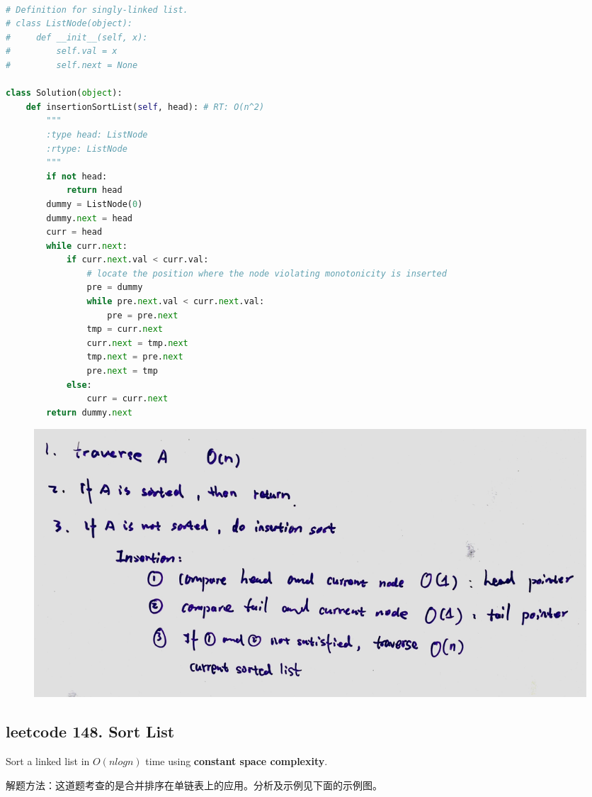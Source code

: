 \documentclass[a4paper,10pt]{article}
\begin{document}
\begin{lstlisting}[language=Python, caption=Problem147. Insertion Sort List]

# Definition for singly-linked list.
# class ListNode(object):
#     def __init__(self, x):
#         self.val = x
#         self.next = None

class Solution(object):
    def insertionSortList(self, head): # RT: O(n^2)
        """
        :type head: ListNode
        :rtype: ListNode
        """
        if not head:
            return head
        dummy = ListNode(0)
        dummy.next = head
        curr = head
        while curr.next:
            if curr.next.val < curr.val:
                # locate the position where the node violating monotonicity is inserted
                pre = dummy
                while pre.next.val < curr.next.val:
                    pre = pre.next
                tmp = curr.next
                curr.next = tmp.next
                tmp.next = pre.next
                pre.next = tmp
            else:
                curr = curr.next
        return dummy.next
\end{lstlisting}

\begin{figure}[h]
    \includegraphics[width=1\textwidth]{leetcode147.jpg}
    \centering\\
\end{figure}


\subsection{leetcode 148. Sort List}
Sort a linked list in $O(nlogn)$ time using \textbf{constant space complexity}. \\

\begin{CJK*}{UTF8}{gbsn}
\noindent 解题方法：这道题考查的是合并排序在单链表上的应用。分析及示例见下面的示例图。
\end{CJK*}\\
\end{document}
